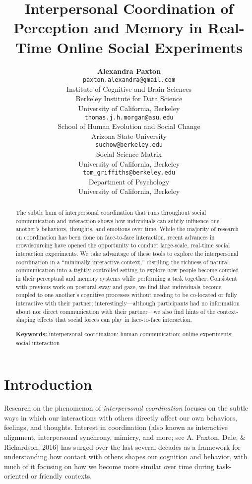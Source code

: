 \documentclass[10pt, letterpaper]{article}
\title{Interpersonal Coordination of Perception and Memory in Real-Time Online
Social Experiments}
\author{{\large \bf Alexandra Paxton} \\ \texttt{paxton.alexandra@gmail.com} \\ Institute of Cognitive and Brain Sciences \\ Berkeley Institute for Data Science \\ University of California, Berkeley \And {\large \bf Thomas J. H. Morgan} \\ \texttt{thomas.j.h.morgan@asu.edu} \\ School of Human Evolution and Social Change \\ Arizona State University \AND {\large \bf Jordan W. Suchow} \\ \texttt{suchow@berkeley.edu} \\ Social Science Matrix \\ University of California, Berkeley \And {\large \bf Thomas L. Griffiths} \\ \texttt{tom\_griffiths@berkeley.edu} \\ Department of Psychology \\ University of California, Berkeley}
\begin{document}
\maketitle

\begin{abstract}
The subtle hum of interpersonal coordination that runs throughout social
communication and interaction shows how individuals can subtly influence
one another's behaviors, thoughts, and emotions over time. While the
majority of research on coordination has been done on face-to-face
interaction, recent advances in crowdsourcing have opened the
opportunity to conduct large-scale, real-time social interaction
experiments. We take advantage of these tools to explore the
interpersonal coordination in a ``minimally interactive context,''
distilling the richness of natural communication into a tightly
controlled setting to explore how people become coupled in their
perceptual and memory systems while performing a task together.
Consistent with previous work on postural sway and gaze, we find that
individuals become coupled to one another's cognitive processes without
needing to be co-located or fully interactive with their partner;
interestingly---although participants had no information about nor
direct communication with their partner---we also find hints of the
context-shaping effects that social forces can play in face-to-face
interaction.

\textbf{Keywords:}
interpersonal coordination; human communication; online experiments;
social interaction
\end{abstract}

\section{Introduction}\label{introduction}

Research on the phenomenon of \emph{interpersonal coordination} focuses
on the subtle ways in which our interactions with others directly affect
our own behaviors, feelings, and thoughts. Interest in coordination
(also known as interactive alignment, interpersonal synchrony, mimicry,
and more; see A. Paxton, Dale, \& Richardson, 2016) has surged over the
last several decades as a framework for understanding how contact with
others shapes our cognition and behavior, with much of it focusing on
how we become more similar over time during task-oriented or friendly
contexts.
\end{document}
